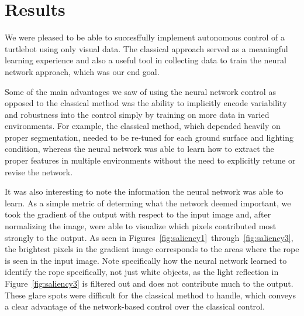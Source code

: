 \section{Results}
\label{sec:results}

We were pleased to be able to succesffully implement autonomous control of a turtlebot using only visual data. The classical approach served as a meaningful learning experience and also a useful tool in collecting data to train the neural network approach, which was our end goal.

Some of the main advantages we saw of using the neural network control as opposed to the classical method was the ability to implicitly encode variability and robustness into the control simply by training on more data in varied environments. For example, the classical method, which depended heavily on proper segmentation, needed to be re-tuned for each ground surface and lighting condition, whereas the neural network was able to learn how to extract the proper features in multiple environments without the need to explicitly retune or revise the network.

It was also interesting to note the information the neural network was able to learn. As a simple metric of determing what the network deemed important, we took the gradient of the output with respect to the input image and, after normalizing the image, were able to visualize which pixels contributed most strongly to the output. As seen in Figures~\ref{fig:saliency1}~through~\ref{fig:saliency3}, the brightest pixels in the gradient image corresponds to the areas where the rope is seen in the input image. Note specifically how the neural network learned to identify the rope specifically, not just white objects, as the light reflection in Figure~\ref{fig:saliency3} is filtered out and does not contribute much to the output. These glare spots were difficult for the classical method to handle, which conveys a clear advantage of the network-based control over the classical control.


